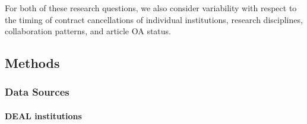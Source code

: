 \documentclass[
]{article}
\begin{document}
For both of these research questions, we also consider variability with respect to the timing of contract cancellations of individual institutions, research disciplines, collaboration patterns, and article OA status.

\hypertarget{methods}{%
\subsection{Methods}\label{methods}}

\hypertarget{data-sources}{%
\subsubsection{Data Sources}\label{data-sources}}

\hypertarget{deal-institutions}{%
\paragraph{DEAL institutions}\label{deal-institutions}}
\end{document}
